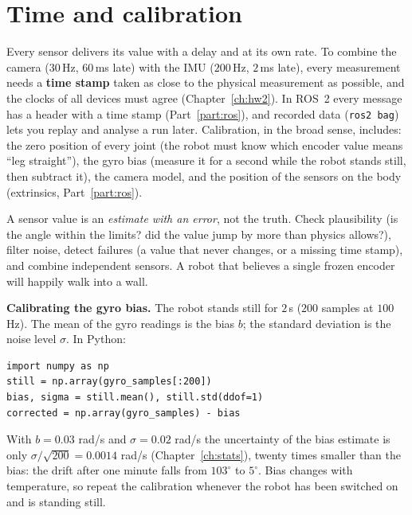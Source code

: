 \section*{Time and calibration}
Every sensor delivers its value with a delay and at its own rate. To combine the camera ($30$\,Hz, $60$\,ms late) with the IMU ($200$\,Hz, $2$\,ms late), every measurement needs a \textbf{time stamp} taken as close to the physical measurement as possible, and the clocks of all devices must agree (Chapter~\ref{ch:hw2}). In ROS~2 every message has a header with a time stamp (Part~\ref{part:ros}), and recorded data (\texttt{ros2 bag}) lets you replay and analyse a run later. Calibration, in the broad sense, includes: the zero position of every joint (the robot must know which encoder value means ``leg straight''), the gyro bias (measure it for a second while the robot stands still, then subtract it), the camera model, and the position of the sensors on the body (extrinsics, Part~\ref{part:ros}).

\begin{keyidea}
A sensor value is an \emph{estimate with an error}, not the truth. Check plausibility (is the angle within the limits? did the value jump by more than physics allows?), filter noise, detect failures (a value that never changes, or a missing time stamp), and combine independent sensors. A robot that believes a single frozen encoder will happily walk into a wall.
\end{keyidea}

\begin{example}
\textbf{Calibrating the gyro bias.} The robot stands still for $2$\,s ($200$ samples at $100$\,Hz). The mean of the gyro readings is the bias $b$; the standard deviation is the noise level $\sigma$. In Python:
\begin{verbatim}
import numpy as np
still = np.array(gyro_samples[:200])
bias, sigma = still.mean(), still.std(ddof=1)
corrected = np.array(gyro_samples) - bias
\end{verbatim}
With $b=0.03$ rad/s and $\sigma=0.02$ rad/s the uncertainty of the bias estimate is only $\sigma/\sqrt{200}=0.0014$ rad/s (Chapter~\ref{ch:stats}), twenty times smaller than the bias: the drift after one minute falls from $103^\circ$ to $5^\circ$. Bias changes with temperature, so repeat the calibration whenever the robot has been switched on and is standing still.
\end{example}


